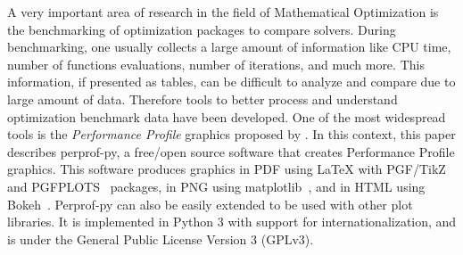 A very important area of research in the field of Mathematical Optimization is the benchmarking of
optimization packages to compare solvers.
During benchmarking, one usually
collects a large amount of information like CPU time, number of functions
evaluations, number of iterations, and much more. This information, if
presented as tables, can be difficult to analyze and compare due to
large amount of data.  Therefore 
tools to better process and understand optimization benchmark data have been developed. One of
the most widespread tools is the \emph{Performance Profile} graphics proposed by
\textcite{Dolan:2002du}. In this context, this paper describes perprof-py, a free/open source software
that creates Performance Profile graphics. This software produces graphics in PDF using LaTeX with
PGF/TikZ~\cite{TikZ} and PGFPLOTS~\cite{pgfplots} packages, in
PNG using matplotlib~\cite{Hunter:2007}, and in HTML using
Bokeh~\cite{url:bokeh}. Perprof-py  can also be easily
extended to be used with other plot libraries. It is implemented
in Python 3 with support for internationalization, and is under the General
Public License Version 3 (GPLv3).
